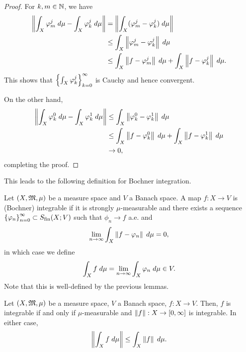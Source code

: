 \documentclass[a4paper]{article}
\begin{document}
\begin{proof}
For $k, m \in \mathbb{N}$, we have 
\[
\begin{aligned}
  \left\lVert \int_X \varphi_m^j \; d\mu - \int_X \varphi_k^j \; d \mu\right\rVert 
  &= \left\lVert \int_X (\varphi_m^j - \varphi_k^j) \; d \mu\right\rVert \\
  &\leq \int_X \left\lVert \varphi_m^j - \varphi_k^j\right\rVert \; d \mu \\
  &\leq \int_X \left\lVert f - \varphi_m^j\right\rVert \; d \mu
  + \int_X \left\lVert f - \varphi_k^j\right\rVert \; d \mu.
\end{aligned}
\]
This shows that $\left\{ \int_X \varphi_k^j \right\}_{k=0}^\infty$ is Cauchy
and hence convergent. 

On the other hand, 
\[
\begin{aligned}
\left\lVert \int_X \varphi_k^0 \; d \mu - \int_X \varphi_k^1 \; d \mu\right\rVert
&\leq \int_X \left\lVert \varphi_k^0 - \varphi_k^1\right\rVert \; d \mu \\
&\leq \int_X \left\lVert f - \varphi_k^0\right\rVert \; d \mu
+ \int_X \left\lVert f - \varphi_k^1\right\rVert \; d \mu \\
&\to 0,
\end{aligned}
\]
completing the proof.
\end{proof}

This leads to the following definition for Bochner integration.

\begin{defi}
Let $(X, \mathfrak{M}, \mu)$ be a measure space and $V$ a Banach space. 
A map $f : X \to V$ is (Bochner) integrable if 
it is strongly $\mu$-measurable and there exists a sequence
$\left\{ \varphi_n \right\}_{n=0}^\infty \subset S_{\text{fin}}(X; V)$ such that $\phi_n \to f$
a.e. and 
\[
\lim_{n \to \infty} \int_X \left\lVert f - \varphi_n\right\rVert \; d \mu = 0,
\] 
in which case we define 
\[
\int_X f \; d \mu = \lim_{n \to \infty} \int_X \varphi_n \; d \mu \in V.
\]
Note that this is well-defined by the previous lemmas.
\end{defi}

\begin{thm}
Let $(X, \mathfrak{M}, \mu)$ be a measure space, $V$ a Banach space, 
$f : X \to V$. Then, 
$f$ is integrable if and only if $\mu$-measurable 
and $\left\lVert f\right\rVert : X \to [0, \infty]$ is integrable.
In either case, 
\[
\left\lVert \int_X f \; d \mu\right\rVert \leq \int_X \left\lVert f\right\rVert \; d \mu.
\]
\end{thm}
\end{document}
